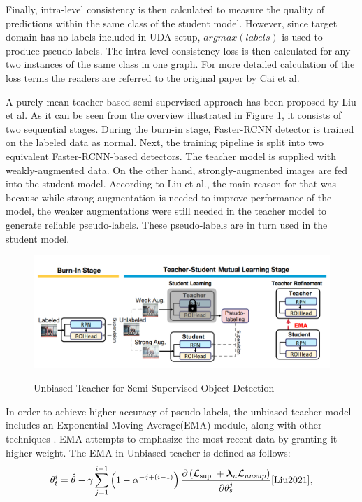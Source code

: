 \documentclass[english, 12pt, a4paper, elec, utf8, a-1b, online]{aaltothesis}
\begin{document}
Finally, intra-level consistency is then calculated to measure the quality of predictions within the same class of the student model. However, since target domain has no labels included in UDA setup, $argmax(labels)$ is used to produce pseudo-labels. The intra-level consistency loss is then calculated for any two instances of the same class in one graph. For more detailed calculation of the loss terms the readers are referred to the original paper by Cai et al. \cite{Cai2019}  

A purely mean-teacher-based semi-supervised approach has been proposed by Liu et al.\cite{Liu2021} As it can be seen from the overview illustrated in Figure \ref{unbiased}, it consists of two sequential stages. During the burn-in stage, Faster-RCNN detector is trained on the labeled data as normal. Next, the training pipeline is split into two equivalent Faster-RCNN-based detectors. The teacher model is supplied with weakly-augmented data. On the other hand, strongly-augmented images are fed into the student model. According to Liu et al., the main reason for that was because while strong augmentation is needed to improve performance of the model, the weaker augmentations were still needed in the teacher model to generate reliable pseudo-labels. These pseudo-labels are in turn used in the student model. 
\begin{figure}[htb]
	\begin{center}
		\includegraphics[width=14cm]{./unbiased.png}
	\end{center}
	\caption{Unbiased Teacher for Semi-Supervised Object Detection\cite{Liu2021}}
	\begin{center}
		\label{unbiased}
	\end{center}
\end{figure}
\FloatBarrier

In order to achieve higher accuracy of pseudo-labels, the unbiased teacher model includes an Exponential Moving Average(EMA) module, along with other techniques \cite{Liu2021}. EMA attempts to emphasize the most recent data by granting it higher weight. The EMA in Unbiased teacher is defined as follows: 
\begin{equation}
\theta_{t}^{i}=\hat{\theta}-\gamma \sum_{j=1}^{i-1}\left(1-\alpha^{-j+(i-1)}\right) \frac{\partial\left(\mathcal{L}_{\text {sup }}+\boldsymbol{\lambda}_{u} \mathcal{L}_{u n s u p}\right)}{\partial \theta_{s}^{j}}
\label{EMA}
\cite{Liu2021},
\end{equation}
\end{document}
